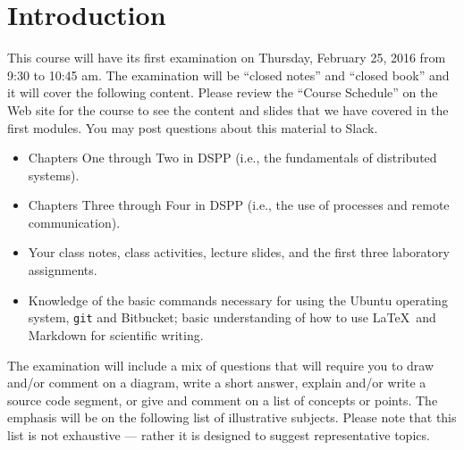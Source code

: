 


\vspace*{-.35in}
\section*{Introduction}
\vspace*{-.05in}

This course will have its first examination on Thursday, February 25, 2016 from 9:30 to 10:45 am. The examination will
be ``closed notes'' and ``closed book'' and it will cover the following content. Please review the ``Course Schedule''
on the Web site for the course to see the content and slides that we have covered in the first modules. You may post
questions about this material to Slack.

\vspace*{-.05in}

\begin{itemize}

  \itemsep 0in

  \item Chapters One through Two in DSPP (i.e., the fundamentals of distributed systems).

  \item Chapters Three through Four in DSPP (i.e., the use of processes and remote communication).

  \item Your class notes, class activities, lecture slides, and the first three laboratory assignments.

  \item Knowledge of the basic commands necessary for using the Ubuntu operating system, {\tt git} and Bitbucket; basic
    understanding of how to use \LaTeX~and Markdown for scientific writing.

\end{itemize}

\vspace*{-.05in}

\noindent The examination will include a mix of questions that will require you to draw and/or comment on a diagram,
write a short answer, explain and/or write a source code segment, or give and comment on a list of concepts or points.
The emphasis will be on the following list of illustrative subjects. Please note that this list is not exhaustive ---
rather it is designed to suggest representative topics.

